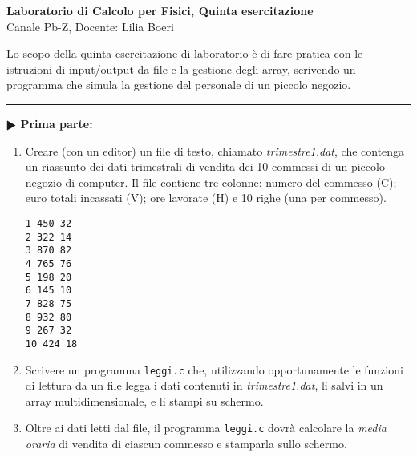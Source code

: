 \documentclass[11pt]{article}
\begin{document}
\pagestyle{empty}

\begin{center}
{\Large \bf  Laboratorio di Calcolo per Fisici, Quinta esercitazione\\[2mm]}
{\large Canale Pb-Z, Docente: Lilia Boeri}
\end{center}
\vspace{4mm}

\begin{mdframed}[backgroundcolor=panna]
  Lo scopo della quinta esercitazione di laboratorio \`e di fare pratica con
le istruzioni di input/output da file e la gestione degli array, scrivendo un programma
che simula la gestione del personale di un piccolo negozio.
  \end{mdframed}
%
%



\hrule
\vspace{2mm}
\textbf{$\RHD$ Prima parte:}
\begin{enumerate}
\item Creare (con un editor) un file di testo, chiamato {\em trimestre1.dat}, che 
contenga un riassunto dei dati trimestrali di vendita dei 10 commessi di
un piccolo negozio di computer. Il file contiene tre colonne: numero del commesso (C);  euro totali incassati (V); ore lavorate (H) e
10 righe (una per commesso).
\begin{mdframed}[backgroundcolor=panna]
\texttt{1    450   32\\
2    322   14\\
3    870   82\\
4    765   76\\
5    198   20\\
6    145   10\\
7    828   75\\
8    932   80\\
9    267   32\\
10   424   18}
\end{mdframed}

\item Scrivere un programma \texttt{leggi.c} che, utilizzando opportunamente le funzioni di lettura da un file 
legga i dati contenuti in {\em trimestre1.dat}, li salvi in un array multidimensionale, e li stampi su schermo.

\item Oltre ai dati letti dal file, il programma \texttt{leggi.c} dovrà
calcolare la {\em media oraria\/} di vendita di ciascun commesso e stamparla sullo schermo.
\end{enumerate}
\end{document}
